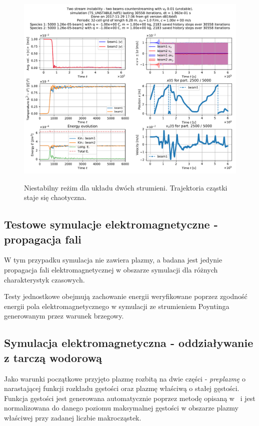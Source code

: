 \begin{figure}[h!]
  \includegraphics[width=\textwidth]{Images/TS_UNSTABLE}
  \label{fig:twostream-unstable}
  \caption{Niestabilny reżim dla układu dwóch strumieni. Trajektoria cząstki staje się chaotyczna.}
\end{figure}

\subsection{Testowe symulacje elektromagnetyczne - propagacja fali}
W tym przypadku symulacja nie zawiera plazmy, a badana jest jedynie propagacja fali elektromagnetycznej w obszarze
symulacji dla różnych charakterystyk czasowych. 

Testy jednostkowe obejmują zachowanie energii weryfikowane poprzez zgodność
energii pola elektromagnetycznego w symulacji ze strumieniem Poyntinga generowanym
przez warunek brzegowy. %


\subsection{Symulacja elektromagnetyczna - oddziaływanie z tarczą wodorową}

Jako warunki początkowe przyjęto plazmę rozbitą na dwie części -
\emph{preplazmę} o narastającej funkcji rozkładu gęstości oraz plazmę właściwą
o stałej gęstości. Funkcja gęstości jest generowana automatycznie poprzez
metodę opisaną w~\cite{birdsall} i jest normalizowana do danego poziomu
maksymalnej gęstości w obszarze plazmy właściwej przy zadanej liczbie
makrocząstek.

